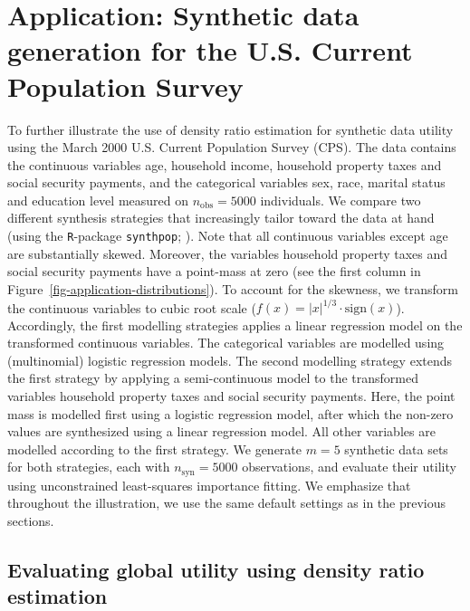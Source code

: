 \documentclass[
]{article}
\begin{document}
\section{Application: Synthetic data generation for the U.S. Current
Population Survey}\label{sec-app}

\linespread{1}

\linespread{2}

To further illustrate the use of density ratio estimation for synthetic
data utility using the March 2000 U.S. Current Population Survey (CPS).
The data contains the continuous variables age, household income,
household property taxes and social security payments, and the
categorical variables sex, race, marital status and education level
measured on \(n_\text{obs} = 5000\) individuals. We compare two
different synthesis strategies that increasingly tailor toward the data
at hand (using the \texttt{R}-package \texttt{synthpop};
). Note that all
continuous variables except age are substantially skewed. Moreover, the
variables household property taxes and social security payments have a
point-mass at zero (see the first column in
Figure~\ref{fig-application-distributions}). To account for the
skewness, we transform the continuous variables to cubic root scale
(\(f(x) = |x|^{1/3}\cdot\text{sign}(x)\)). Accordingly, the first
modelling strategies applies a linear regression model on the
transformed continuous variables. The categorical variables are modelled
using (multinomial) logistic regression models. The second modelling
strategy extends the first strategy by applying a semi-continuous model
to the transformed variables household property taxes and social
security payments. Here, the point mass is modelled first using a
logistic regression model, after which the non-zero values are
synthesized using a linear regression model. All other variables are
modelled according to the first strategy. We generate \(m = 5\)
synthetic data sets for both strategies, each with
\(n_\text{syn} = 5000\) observations, and evaluate their utility using
unconstrained least-squares importance fitting. We emphasize that
throughout the illustration, we use the same default settings as in the
previous sections.

\subsection{Evaluating global utility using density ratio
estimation}\label{evaluating-global-utility-using-density-ratio-estimation}
\end{document}
